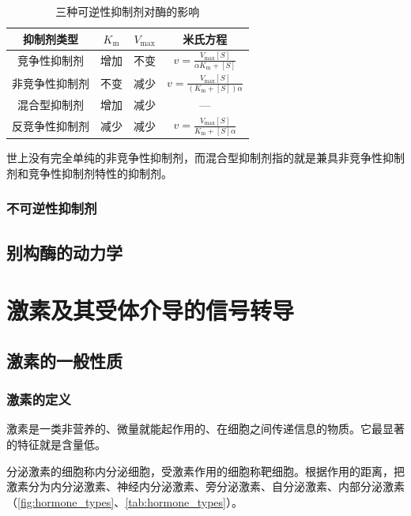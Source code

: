 \begin{table}[htbp]
	\centering
	\begin{tabularx}{\textwidth}{|c|C|C|C|}
		\hline
		\textbf{抑制剂类型} & \textbf{$K_{\text{m}}$} & \textbf{$V_{\text{max}}$} & \textbf{米氏方程} \\ \hline
		竞争性抑制剂 & 增加 & 不变 & $v = \frac{V_{\text{max}} [S]}{\alpha K_{\text{m}} + [S]}$ \\ \hline
		非竞争性抑制剂 & 不变 & 减少 & $v = \frac{V_{\text{max}} [S]}{(K_{\text{m}} + [S])\alpha}$ \\ \hline
		混合型抑制剂 & 增加 & 减少 & --- \\ \hline
		反竞争性抑制剂 & 减少 & 减少 & $v = \frac{V_{\text{max}} [S]}{K_{\text{m}} + [S]\alpha}$ \\ \hline
	\end{tabularx}
	\caption{三种可逆性抑制剂对酶的影响}
	\label{tab:三种可逆性抑制剂对酶的影响}
\end{table}

世上没有完全单纯的非竞争性抑制剂，而混合型抑制剂指的就是兼具非竞争性抑制剂和竞争性抑制剂特性的抑制剂。

\subsubsection{不可逆性抑制剂}

\subsection{别构酶的动力学}



\section[激素和信号转导]{激素及其受体介导的信号转导}

\subsection{激素的一般性质}

\subsubsection{激素的定义}

激素是一类非营养的、微量就能起作用的、在细胞之间传递信息的物质。它最显著的特征就是含量低。

分泌激素的细胞称内分泌细胞，受激素作用的细胞称靶细胞。根据作用的距离，把激素分为内分泌激素、神经内分泌激素、旁分泌激素、自分泌激素、内部分泌激素（\autoref{fig:hormone_types}、\autoref{tab:hormone_types}）。


